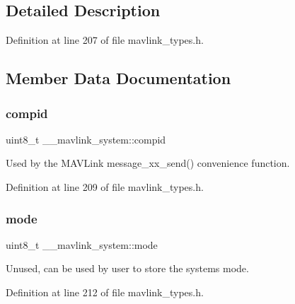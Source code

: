 \subsection{Detailed Description}


Definition at line 207 of file mavlink\+\_\+types.\+h.



\subsection{Member Data Documentation}
\mbox{\label{struct____mavlink__system_a1aec3b4f214beea3276a214c7498cb0f}} 
\subsubsection{\texorpdfstring{compid}{compid}}
{\footnotesize\ttfamily uint8\+\_\+t \+\_\+\+\_\+mavlink\+\_\+system\+::compid}



Used by the M\+A\+V\+Link message\+\_\+xx\+\_\+send() convenience function. 



Definition at line 209 of file mavlink\+\_\+types.\+h.

\mbox{\label{struct____mavlink__system_a4bd3edea462570856b5575eecafd2b6d}} 
\subsubsection{\texorpdfstring{mode}{mode}}
{\footnotesize\ttfamily uint8\+\_\+t \+\_\+\+\_\+mavlink\+\_\+system\+::mode}



Unused, can be used by user to store the system\textquotesingle{}s mode. 



Definition at line 212 of file mavlink\+\_\+types.\+h.

\mbox{\label{struct____mavlink__system_ae653c03239304982024c03ac165c5011}} 

